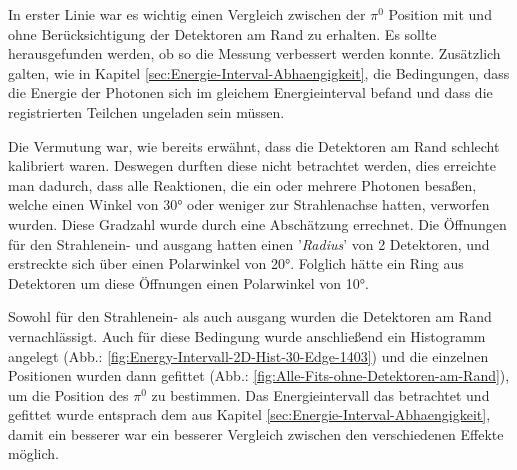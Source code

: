 \documentclass[a4paper,11pt,oneside,final,german,openbib,pdftex]{scrbook}
\begin{document}

In erster Linie war es wichtig einen Vergleich zwischen der $\pi^0$ Position mit und ohne Ber\"ucksichtigung der Detektoren am Rand zu erhalten. Es sollte herausgefunden werden, ob so die Messung verbessert werden konnte. Zus\"atzlich galten, wie in Kapitel \ref{sec:Energie-Interval-Abhaengigkeit}, die Bedingungen, dass die Energie der Photonen sich im gleichem Energieinterval befand und dass die registrierten Teilchen ungeladen sein m\"ussen. 



Die Vermutung war, wie bereits erw\"ahnt, dass die Detektoren am Rand schlecht kalibriert waren. Deswegen durften diese nicht betrachtet werden, dies erreichte man dadurch, dass alle Reaktionen, die ein oder mehrere Photonen besa{\ss}en, welche einen Winkel von 30° oder weniger zur Strahlenachse hatten, verworfen wurden. Diese Gradzahl wurde durch eine Absch\"atzung errechnet. Die \"Offnungen f\"ur den Strahlenein- und ausgang hatten einen '\textit{Radius}' von 2 Detektoren, und erstreckte sich \"uber einen Polarwinkel von 20°. Folglich h\"atte ein Ring aus Detektoren um diese \"Offnungen einen Polarwinkel von 10°. 

Sowohl f\"ur den Strahlenein- als auch ausgang wurden die Detektoren am Rand vernachl\"assigt. 
Auch f\"ur diese Bedingung wurde anschlie{\ss}end ein Histogramm angelegt (Abb.: \ref{fig:Energy-Intervall-2D-Hist-30-Edge-1403}) und die einzelnen Positionen wurden dann gefittet (Abb.: \ref{fig:Alle-Fits-ohne-Detektoren-am-Rand}), um die Position des $\pi^0$ zu bestimmen. Das Energieintervall das betrachtet und gefittet wurde entsprach dem aus Kapitel \ref{sec:Energie-Interval-Abhaengigkeit}, damit ein besserer war ein besserer Vergleich zwischen den verschiedenen Effekte m\"oglich.
\end{document}
